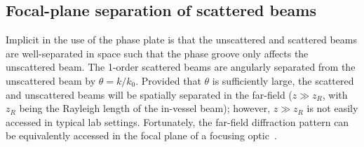 \subsection{Focal-plane separation of scattered beams}
Implicit in the use of the phase plate
is that the unscattered and scattered beams
are well-separated in space
such that the phase groove only affects the unscattered beam.
The 1-order scattered beams are angularly separated
from the unscattered beam by $\theta = k / k_0$.
\graffito{\textcolor{red}{Sufficiently large: $k w_0 \gtrsim 2$?}}
Provided that $\theta$ is sufficiently large,
the scattered and unscattered beams
will be spatially separated in the far-field
($z \gg z_R$, with $z_R$ being the Rayleigh length of the in-vessel beam);
however, $z \gg z_R$ is not easily accessed in typical lab settings.
Fortunately, the far-field diffraction pattern
can be equivalently accessed in the focal plane
of a focusing optic~\cite[Ch.~8]{born_and_wolf}.

